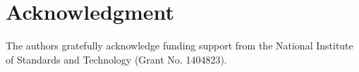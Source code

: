 \section*{Acknowledgment}

The authors gratefully acknowledge funding support from the
National Institute of Standards and Technology (Grant No. 1404823).
